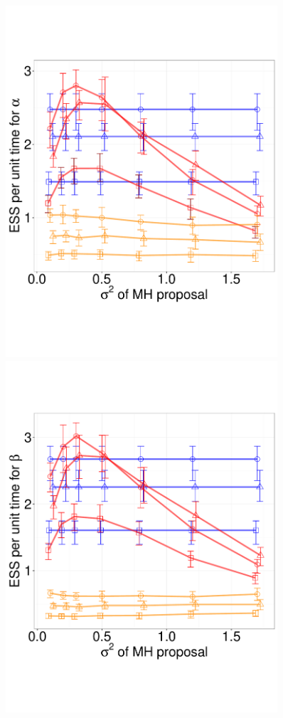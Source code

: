   \begin{figure}[H]
  \centering
  \begin{minipage}[hp]{0.45\linewidth}
  \centering
    \includegraphics [width=0.90\textwidth, angle=0]{figs/q_5_alpha.pdf}
      \end{minipage}
  \begin{minipage}[hp]{0.45\linewidth}
  \centering
    \includegraphics [width=0.90\textwidth, angle=0]{figs/q_5_beta.pdf}

\end{minipage}
\end{figure}
